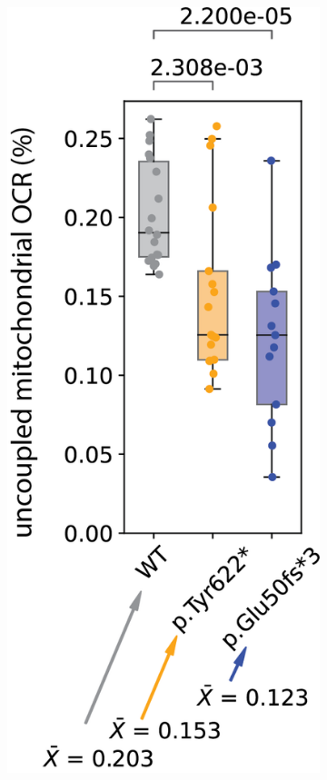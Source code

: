 \begin{figure}[ht]
\begin{subfigure}[t]{.15\textwidth}
        \includegraphics[width=\textwidth]{./main_plots/uncoupling.png}        

\end{subfigure}
\end{figure}
